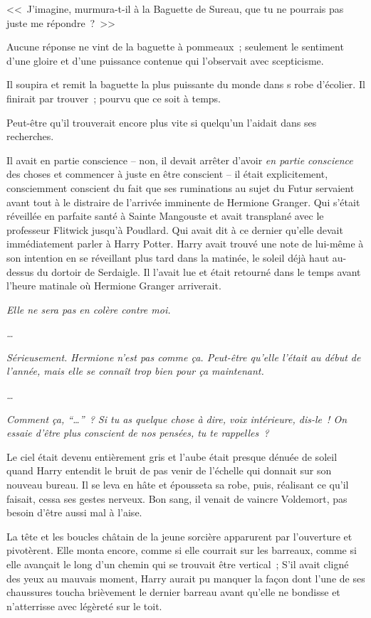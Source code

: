 <<~J'imagine, murmura-t-il à la Baguette de Sureau, que tu ne pourrais pas juste me répondre~?~>>

Aucune réponse ne vint de la baguette à pommeaux~; seulement le sentiment d'une gloire et d'une puissance contenue qui l'observait avec scepticisme.

Il soupira et remit la baguette la plus puissante du monde dans s robe d'écolier. Il finirait par trouver~; pourvu que ce soit à temps.

Peut-être qu'il trouverait encore plus vite si quelqu'un l'aidait dans ses recherches.

Il avait en partie conscience -- non, il devait arrêter d'avoir \emph{en partie conscience} des choses et commencer à juste en être conscient -- il était explicitement, consciemment conscient du fait que ses ruminations au sujet du Futur servaient avant tout à le distraire de l'arrivée imminente de Hermione Granger. Qui s'était réveillée en parfaite santé à Sainte Mangouste et avait transplané avec le professeur Flitwick jusqu'à Poudlard. Qui avait dit à ce dernier qu'elle devait immédiatement parler à Harry Potter. Harry avait trouvé une note de lui-même à son intention en se réveillant plus tard dans la matinée, le soleil déjà haut au-dessus du dortoir de Serdaigle. Il l'avait lue et était retourné dans le temps avant l'heure matinale où Hermione Granger arriverait.

\emph{Elle ne sera pas en colère contre moi.}

\emph{…}

\emph{Sérieusement. Hermione n'est pas comme ça. Peut-être qu'elle l'était au début de l'année, mais elle se connaît trop bien pour ça maintenant.}

\emph{…}

\emph{Comment ça, “…”~? Si tu as quelque chose à dire, voix intérieure, dis-le~! On essaie d'être plus conscient de nos pensées, tu te rappelles~?}

\later

Le ciel était devenu entièrement gris et l'aube était presque dénuée de soleil quand Harry entendit le bruit de pas venir de l'échelle qui donnait sur son nouveau bureau. Il se leva en hâte et épousseta sa robe, puis, réalisant ce qu'il faisait, cessa ses gestes nerveux. Bon sang, il venait de vaincre Voldemort, pas besoin d'être aussi mal à l'aise.

La tête et les boucles châtain de la jeune sorcière apparurent par l'ouverture et pivotèrent. Elle monta encore, comme si elle courrait sur les barreaux, comme si elle avançait le long d'un chemin qui se trouvait être vertical~; S'il avait cligné des yeux au mauvais moment, Harry aurait pu manquer la façon dont l'une de ses chaussures toucha brièvement le dernier barreau avant qu'elle ne bondisse et n'atterrisse avec légèreté sur le toit.

